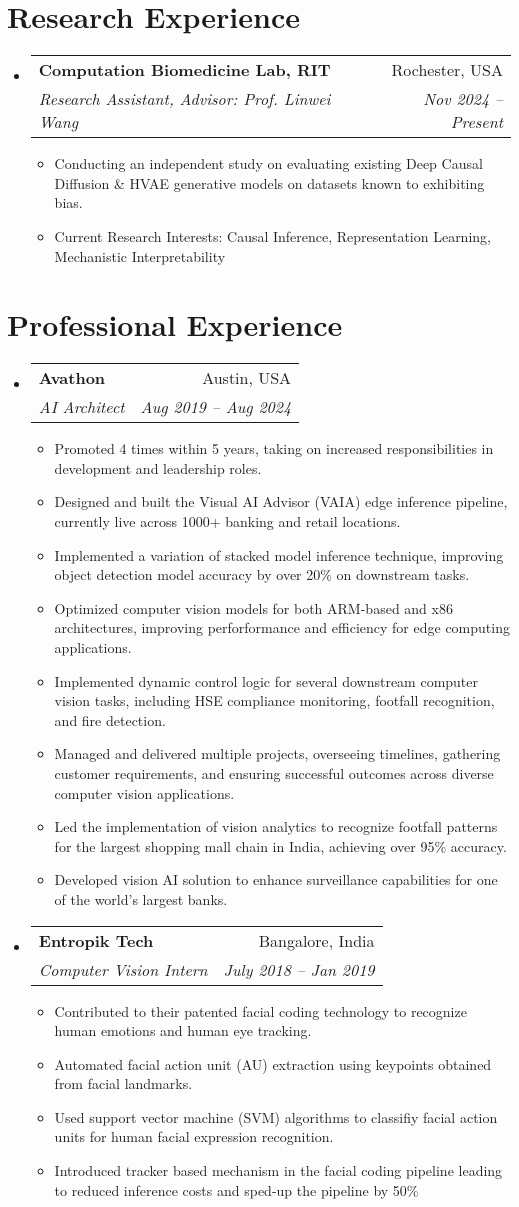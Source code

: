 \documentclass[letterpaper,10pt]{article}
\makeatletter
\newcommand{\resumeItem}[1]{
  \item\small{
    {#1 \vspace{-2pt}}
  }
}
\newcommand{\resumeSubheading}[4]{
  \vspace{-2pt}\item
    \begin{tabular*}{0.97\textwidth}[t]{l@{\extracolsep{\fill}}r}
      \textbf{#1} & #2 \\
      \textit{\small#3} & \textit{\small #4} \\
    \end{tabular*}\vspace{-7pt}
}
\newcommand{\resumeSubHeadingListStart}{\begin{itemize}[leftmargin=0.15in, label={}]}
\newcommand{\resumeSubHeadingListEnd}{\end{itemize}}
\newcommand{\resumeItemListStart}{\begin{itemize}}
\newcommand{\resumeItemListEnd}{\end{itemize}\vspace{-5pt}}
\makeatother
\begin{document}
\section{Research Experience}
  \resumeSubHeadingListStart
    \resumeSubheading
        {Computation Biomedicine Lab, RIT}{Rochester, USA}
        {Research Assistant, Advisor: Prof. Linwei Wang}{Nov 2024 -- Present}  
          \resumeItemListStart
            \resumeItem{Conducting an independent study on evaluating existing Deep Causal Diffusion \& HVAE generative models on datasets known to exhibiting bias.}
            \resumeItem{Current Research Interests: Causal Inference, Representation Learning, Mechanistic Interpretability}
          \resumeItemListEnd
  \resumeSubHeadingListEnd

\section{Professional Experience}
  \resumeSubHeadingListStart
    \resumeSubheading
      {Avathon}{Austin, USA}
      {AI Architect}{Aug 2019 -- Aug 2024}
      \resumeItemListStart
        \resumeItem{Promoted 4 times within 5 years, taking on increased responsibilities in development and leadership roles.}
        \resumeItem{Designed and built the Visual AI Advisor (VAIA) edge inference pipeline, currently live across 1000+ banking and retail locations.}
        \resumeItem{Implemented a variation of stacked model inference technique, improving object detection model accuracy by over 20\% on downstream tasks.}
        \resumeItem{Optimized computer vision models for both ARM-based and x86 architectures, improving perforformance and efficiency for edge computing applications.}
        \resumeItem{Implemented dynamic control logic for several downstream computer vision tasks, including HSE compliance monitoring, footfall recognition, and fire detection.}
        \resumeItem{Managed and delivered multiple projects, overseeing timelines, gathering customer requirements, and ensuring successful outcomes across diverse computer vision applications.}
        \resumeItem{Led the implementation of vision analytics to recognize footfall patterns for the largest shopping mall chain in India, achieving over 95\% accuracy.}
        \resumeItem{Developed vision AI solution to enhance surveillance capabilities for one of the world's largest banks.}
      \resumeItemListEnd

      \resumeSubheading
      {Entropik Tech}{Bangalore, India}
      {Computer Vision Intern}{July 2018 -- Jan 2019}
      \resumeItemListStart
        \resumeItem{Contributed to their patented facial coding technology to recognize human emotions and human eye tracking.}
        \resumeItem{Automated facial action unit (AU) extraction using keypoints obtained from facial landmarks.}
        \resumeItem{Used support vector machine (SVM) algorithms to classifiy facial action units for human facial expression recognition.}
        \resumeItem{Introduced tracker based mechanism in the facial coding pipeline leading to reduced inference costs and sped-up the pipeline by 50\%}
      \resumeItemListEnd
  \resumeSubHeadingListEnd
\end{document}
